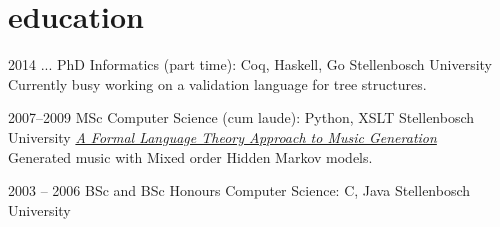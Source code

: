 \documentclass[print]{friggeri-cv-a4} %
\begin{document}
\section{education}

\begin{entrylist}

\entry
{2014 ...}
{PhD {\normalfont Informatics} (part time): {\normalfont Coq, Haskell, Go}}
{Stellenbosch University}
{Currently busy working on a validation language for tree structures.}

\entry
{2007--2009}
{MSc {\normalfont Computer Science} (cum laude): {\normalfont Python, XSLT}}
{Stellenbosch University}
{\href{http://superwillow.sourceforge.net/}{\emph{A Formal Language Theory Approach to Music Generation}} \\ Generated music with Mixed order Hidden Markov models.}

\entry
{2003 -- 2006}
{BSc and BSc Honours {\normalfont Computer Science: C, Java}}
{Stellenbosch University}
{}

\end{entrylist}
\end{document}
